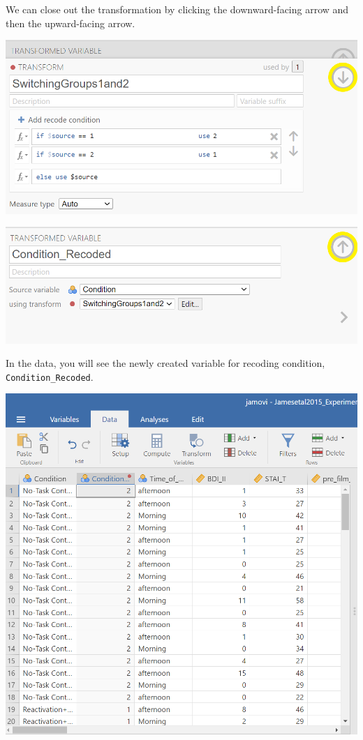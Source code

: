 \documentclass[
]{book}
\begin{document}
We can close out the transformation by clicking the downward-facing arrow and then the upward-facing arrow.

\includegraphics{img/ClosingTransformation.png}

\includegraphics{img/ClosingTransformation2.png}

In the data, you will see the newly created variable for recoding condition, \texttt{Condition\_Recoded}.

\includegraphics{img/RecodedConditionVariableResults.png}
\end{document}
